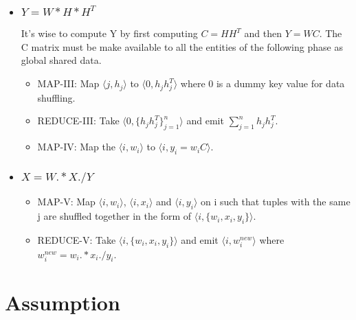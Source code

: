 \documentclass[a4paper,12pt]{article}
\begin{document}
\begin{itemize}
\begin{itemize}
     \item \subsubsection{$ Y = W * H * H^T $}
       It's wise to compute Y by first computing $C= H H^T$ and then
       $Y=WC$. The C matrix must be make available to all the entities
       of the following phase as global
       shared data.

       \begin{itemize}

         \item MAP-III: Map $\langle j, h_j \rangle$ to  $\langle 0,
           h_j h_j^T \rangle$ where 0 is a dummy key value for data
           shuffling.

          \item REDUCE-III: Take $\langle 0, \{h_j h_j^T\}_{j=1}^{n}
            \rangle $ and emit $\sum_{j=1}^{n} h_j h_j^T $.

         \item MAP-IV: Map the $ \langle i, w_i \rangle$ to $ \langle
           i, y_i = w_iC \rangle$.

       \end{itemize}


      \item \subsubsection{$ X = W .* X ./ Y $}
        \begin{itemize}

         \item MAP-V: Map $\langle i, w_i \rangle$, $\langle i, x_i
           \rangle$ and $\langle i, y_i \rangle$ on i such that tuples
           with the same j are shuffled together in the form of
           $\langle i, \{w_i, x_i, y_i\} \rangle$.

          \item REDUCE-V: Take $\langle i, \{w_i, x_i, y_i\} \rangle$
            and emit $\langle i, w_i^{new} \rangle$ where $w_i^{new} =
            w_i .* x_i ./ y_i $.

       \end{itemize}

    \end{itemize}


\end{itemize}


\section{Assumption}
\end{document}
